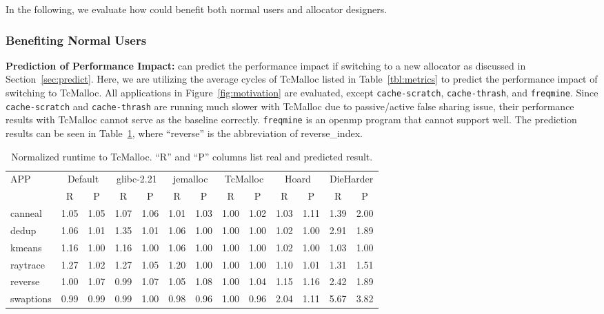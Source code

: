 In the following, we evaluate how \MP{} could benefit both normal users and allocator designers. 
\subsubsection{Benefiting Normal Users\\} 

\noindent \textbf{Prediction of Performance Impact:} 
\MP{} can predict the performance impact if switching to a new allocator as discussed in Section~\ref{sec:predict}. Here, we are utilizing the average cycles of TcMalloc listed in Table~\ref{tbl:metrics} to predict the performance impact of switching to TcMalloc. All applications in Figure~\ref{fig:motivation} are evaluated, except \texttt{cache-scratch},  \texttt{cache-thrash}, and \texttt{freqmine}.  Since \texttt{cache-scratch} and \texttt{cache-thrash} are running much slower with TcMalloc due to passive/active false sharing issue, their performance results with TcMalloc cannot serve as the baseline correctly. \texttt{freqmine} is an openmp program that \MP{} cannot support well. The prediction results can be seen in Table~\ref{tbl:predictionResult}, where ``reverse'' is the abbreviation of reverse\_index. 

\begin{table}[]
  \centering
  \footnotesize
  \setlength{\tabcolsep}{0.1em}
\begin{tabular}{l|c|c|c|c|c|c|c|c|c|c|c|c}
\hline
 \multirow{2}{*}{APP} &
  \multicolumn{2}{c|}{Default} &
  \multicolumn{2}{c|}{glibc-2.21} &
  \multicolumn{2}{c|}{jemalloc} &
  \multicolumn{2}{c|}{TcMalloc} &
  \multicolumn{2}{c|}{Hoard} &
  \multicolumn{2}{c}{DieHarder} \\ \cline{2-13}
  & R & P & R & P & R & P & R & P & R & P  & R & P    \\ \hline
canneal        & 1.05 & 1.05 & 1.07 & 1.06 & 1.01 & 1.03 & 1.00 & 1.02 & 1.03 & 1.11 & 1.39 & 2.00 \\ \hline
dedup          & 1.06 & 1.01 & 1.35 & 1.01 & 1.06 & 1.00 & 1.00 & 1.00 & 1.02 & 1.00 & 2.91 & 1.89 \\ \hline
kmeans         & 1.16 & 1.00 & 1.16 & 1.00 & 1.06 & 1.00 & 1.00 & 1.00 & 1.02 & 1.00 & 1.03 & 1.00 \\ \hline
raytrace       & 1.27 & 1.02 & 1.27 & 1.05 & 1.20 & 1.00 & 1.00 & 1.00 & 1.10 & 1.01 & 1.31 & 1.51 \\ \hline
reverse & 1.00 & 1.07 & 0.99 & 1.07 & 1.05 & 1.08 & 1.00 & 1.04 & 1.15 & 1.16 & 2.42 & 1.89 \\ \hline
swaptions      & 0.99 & 0.99 & 0.99 & 1.00 & 0.98 & 0.96 & 1.00 & 0.96 & 2.04 & 1.11 & 5.67 & 3.82 \\ \hline
\end{tabular}
   \caption{Normalized runtime to TcMalloc. ``R'' and ``P'' columns list real and predicted result.  \label{tbl:predictionResult}}
\end{table}

